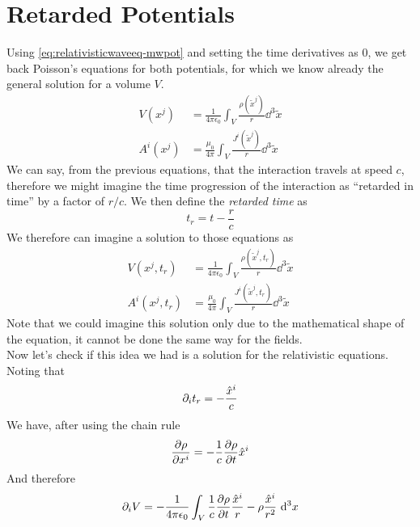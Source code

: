 \documentclass[../electromagnetism.tex]{subfiles}
\begin{document}
\section{Retarded Potentials}
Using \eqref{eq:relativisticwaveeq-mwpot} and setting the time derivatives as 0, we get back Poisson's equations for both potentials, for which we know already the general solution for a volume $V$.
\begin{equation*}
	\begin{aligned}
		V(x^j)&=\frac{1}{4\pi\epsilon_0}\int_{V}^{}\frac{\rho(\tilde{x}^j)}{r}\dd^3{\tilde{x}}\\
		A^i(x^j)&=\frac{\mu_0}{4\pi}\int_{V}^{}\frac{J^i(\tilde{x}^j)}{r}\dd^3{\tilde{x}}
	\end{aligned}
\end{equation*}
We can say, from the previous equations, that the interaction travels at speed $c$, therefore we might imagine the time progression of the interaction as ``retarded in time'' by a factor of $r/c$. We then define the \textit{retarded time} as
\begin{equation}
	t_r=t-\frac{r}{c}
	\label{eq:retardedtime}
\end{equation}
We therefore can imagine a solution to those equations as 
\begin{equation}
	\begin{aligned}
		V(x^j,t_r)&=\frac{1}{4\pi\epsilon_0}\int_{V}^{}\frac{\rho(\tilde{x}^j,t_r)}{r}\dd^3{\tilde{x}}\\
		A^i(x^j,t_r)&=\frac{\mu_0}{4\pi}\int_{V}^{}\frac{J^i(\tilde{x}^j,t_r)}{r}\dd^3{\tilde{x}}
	\end{aligned}
	\label{eq:retardedsolution}
\end{equation}
Note that we could imagine this solution only due to the mathematical shape of the equation, it cannot be done the same way for the fields.\\
Now let's check if this idea we had is a solution for the relativistic equations. Noting that
\begin{equation*}
	\partial_it_r=-\frac{\hat{x}^i}{c}
\end{equation*}
We have, after using the chain rule
\begin{equation*}
	\pdv{\rho}{x^i}=-\frac{1}{c}\pdv{\rho}{t}\hat{x}^i
\end{equation*}
And therefore
\begin{equation*}
	\partial_iV=-\frac{1}{4\pi\epsilon_0}\int_{V}^{}\frac{1}{c}\pdv{\rho}{t}\frac{\hat{x}^i}{r}-\rho\frac{\hat{x}^i}{r^2}\ \mathrm{d}^3{x}
\end{equation*}
\end{document}
